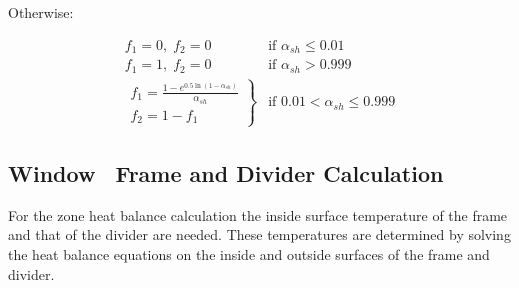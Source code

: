 Otherwise:

\begin{equation}
  \begin{array}{cl}
    f_1 = 0,\;f_2 = 0 &\text{if~} \alpha_{sh} \le 0.01 \\
    f_1 = 1,\;f_2 = 0 &\text{if~} \alpha_{sh} > 0.999 \\
    \left.
      \begin{array}{l}
        f_1 = \frac{1 - e^{0.5 \ln (1 - \alpha_{sh})}} {\alpha_{sh}} \\
        f_2 = 1 - {f_1}
      \end{array}
    \right\} &\text{if~} 0.01 < \alpha_{sh} \le 0.999
  \end{array}
\end{equation}

\subsection{Window~ Frame and Divider Calculation}\label{window-frame-and-divider-calculation}

For the zone heat balance calculation the inside surface temperature of the frame and that of the divider are needed. These temperatures are determined by solving the heat balance equations on the inside and outside surfaces of the frame and divider.

